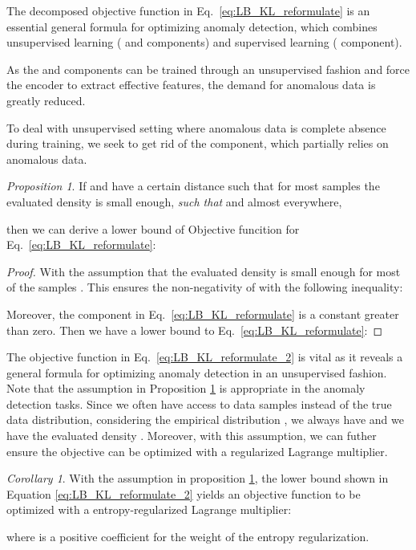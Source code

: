 \documentclass[journal]{IEEEtran}
\theoremstyle{remark}
\newtheorem{proposition}{Proposition}
\newtheorem{corollary}{Corollary}[proposition]
\begin{document}
The decomposed objective function in Eq.~\ref{eq:LB_KL_reformulate} is an essential general formula for optimizing anomaly detection, which combines unsupervised learning ( and  components) and supervised learning ( component). 
 
As the  and  components can be trained through an unsupervised fashion and force the encoder to extract effective features, the demand for anomalous data is greatly reduced.

To deal with unsupervised setting where anomalous data is complete absence during training, we seek to get rid of the  component, which partially relies on anomalous data.
\begin{proposition}\label{prop:obj-lb}
If  and  have a certain distance such that for most samples  the evaluated density  is small enough, \textit{such that}  and  almost everywhere,

then we can derive a lower bound of Objective funcition for Eq.~\ref{eq:LB_KL_reformulate}:


\end{proposition}
\begin{proof}
With the assumption that the evaluated density   is small enough for most of the samples . This ensures the non-negativity of  with the following inequality:

Moreover, the  component in Eq.~\ref{eq:LB_KL_reformulate} is a constant greater than zero. Then we have a lower bound to  Eq.~\ref{eq:LB_KL_reformulate}:

\end{proof}

The objective function in Eq.~\ref{eq:LB_KL_reformulate_2} is vital as it reveals a general formula for optimizing anomaly detection in an unsupervised fashion. Note that the assumption in Proposition \ref{prop:obj-lb} is appropriate in the anomaly detection tasks. Since we often have access to data samples instead of the true data distribution, considering the empirical distribution , we always have  and we have the evaluated density . Moreover, with this assumption, we can futher ensure the objective can be optimized with a regularized Lagrange multiplier.


\begin{corollary}
\label{prop:soft-constrain}
With the assumption in proposition \ref{prop:soft-constrain}, the lower bound shown in Equation \ref{eq:LB_KL_reformulate_2} yields an objective function to be optimized with a entropy-regularized Lagrange multiplier:

where  is a positive coefficient for the weight of the entropy regularization.
\end{corollary}
\end{document}
